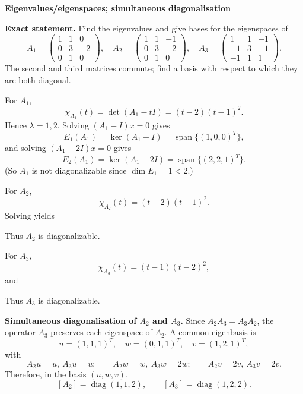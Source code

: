 \begin{problem}[CP-I-0071]
\label{prob:cp-i-0071}
\textbf{Eigenvalues/eigenspaces; simultaneous diagonalisation}

\textbf{Exact statement.}
\hspace*{1.5em}Find the eigenvalues and give bases for the eigenspaces of
\[
A_1=\begin{pmatrix}1&1&0\\0&3&-2\\0&1&0\end{pmatrix},\quad
A_2=\begin{pmatrix}1&1&-1\\0&3&-2\\0&1&0\end{pmatrix},\quad
A_3=\begin{pmatrix}1&1&-1\\-1&3&-1\\-1&1&1\end{pmatrix}.
\]
The second and third matrices commute; find a basis with respect to which they are both diagonal.

\end{problem}

\begin{solution}
For $A_1$,
\[
\chi_{A_1}(t)=\det(A_1-tI)=(t-2)(t-1)^2.
\]
Hence $\lambda=1,2$. Solving $(A_1-I)x=0$ gives
\[
E_1(A_1)=\ker(A_1-I)=\operatorname{span}\{(1,0,0)^T\},
\]
and solving $(A_1-2I)x=0$ gives
\[
E_2(A_1)=\ker(A_1-2I)=\operatorname{span}\{(2,2,1)^T\}.
\]
(So $A_1$ is not diagonalizable since $\dim E_1=1<2$.)

For $A_2$,
\[
\chi_{A_2}(t)=(t-2)(t-1)^2.
\]
Solving yields
\begin{center}
\end{center}
Thus $A_2$ is diagonalizable.

For $A_3$,
\[
\chi_{A_3}(t)=(t-1)(t-2)^2,
\]
and
\begin{center}
\end{center}
Thus $A_3$ is diagonalizable.

\medskip
\textbf{Simultaneous diagonalisation of $A_2$ and $A_3$.}
Since $A_2A_3=A_3A_2$, the operator $A_3$ preserves each eigenspace of $A_2$.
A common eigenbasis is
\[
u=(1,1,1)^T,\quad w=(0,1,1)^T,\quad v=(1,2,1)^T,
\]
with
\[
A_2u=u,\ A_3u=u;\qquad A_2w=w,\ A_3w=2w;\qquad A_2v=2v,\ A_3v=2v.
\]
Therefore, in the basis $(u,w,v)$,
\[
[A_2]=\operatorname{diag}(1,1,2),\qquad [A_3]=\operatorname{diag}(1,2,2).
\]
\end{solution}

